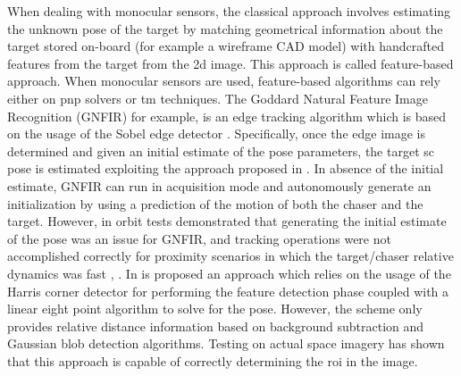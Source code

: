 When dealing with monocular sensors, the classical approach involves estimating the unknown pose of the target by matching geometrical information about the target stored on-board (for example a wireframe CAD model) with handcrafted features from the target from the \acrshort{2d} image. This approach is called feature-based approach. When monocular sensors are used, feature-based algorithms can rely either on \acrshort{pnp} solvers or \acrfull{tm} techniques.
The Goddard Natural Feature Image Recognition (GNFIR) for example, is an edge tracking algorithm which is based on the usage of the Sobel edge detector \cite{Opromolla2017}. Specifically, once the edge image is determined and given an initial estimate of the pose parameters, the target \acrshort{sc} pose is estimated exploiting the approach proposed in \cite{Drummond2002}. In absence of the initial estimate, GNFIR can run in acquisition mode and autonomously generate an initialization by using a prediction of the motion of both the chaser and the target. However, in orbit tests demonstrated that generating the initial estimate of the pose was an issue for GNFIR, and tracking operations were not accomplished correctly for proximity scenarios in which the target/chaser relative dynamics was fast \cite{D2014}, \cite{Naasz2010}.
In \cite{Grompone2015} is proposed an approach which relies on the usage of the Harris corner detector \cite{Harris1988ACC} for performing the feature detection phase coupled with a linear eight point algorithm to solve for the pose. However, the scheme only provides relative distance information based on background subtraction and Gaussian blob detection algorithms. Testing on actual space imagery has shown that this approach is capable of correctly determining the \acrshort{roi} in the image.
